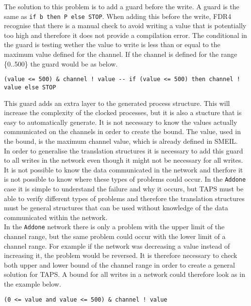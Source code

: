 The solution to this problem is to add a guard before the write. A \cspm{} guard is the same as \texttt{if b then P else STOP}. When adding this before the write, FDR4 recognise that there is a manual check to avoid writing a value that is potentially too high and therefore it does not provide a compilation error. The conditional in the guard is testing wether the value to write is less than or equal to the maximum value defined for the channel. If the channel is defined for the range \{0..500\} the guard would be as below.
\begin{verbatim}
(value <= 500) & channel ! value -- if (value <= 500) then channel ! value else STOP
\end{verbatim}

This guard adds an extra layer to the generated process structure. This will increase the complexity of the clocked processes, but it is also a stucture that is easy to automatically generate. It is not necessary to know the values actually communicated on the channels in order to create the bound. The value, used in the bound, is the maximum channel value, which is already defined in SMEIL. \\

In order to generalise the translation structures it is necessary to add this guard to all writes in the network even though it might not be necessary for all writes. It is not possible to know the data communicated in the network and therfore it is not possible to know where these types of problems could occur. In the \texttt{Addone} case it is simple to understand the failure and why it occurs, but TAPS must be able to verify different types of problems and therefore the translation structures must be general structures that can be used without knowledge of the data communicated within the network. \\

In the \texttt{Addone} network there is only a problem with the upper limit of the channel range, but the same problem could occur with the lower limit of a channel range. For example if the network was decreasing a value instead of increasing it, the problem would be reversed. It is therefore necessary to check both upper and lower bound of the channel range in order to create a general solution for TAPS. A bound for all writes in a network could therefore look as in the example below.
\begin{verbatim}
(0 <= value and value <= 500) & channel ! value
\end{verbatim}
